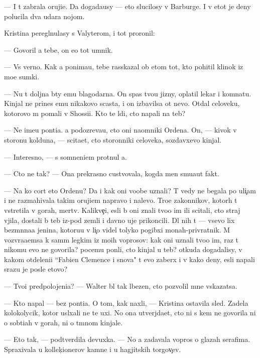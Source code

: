 \documentclass[10pt]{book}
\begin{document}
— I t{\yi} zabrala oruji{\y}e. Da{\y} dogada{\y}usy — eto slucilosy v Barburge. I v etot je deny polucila dva udara nojom.

Kristina peregl{\ia}nulasy s Valyterom, i tot proronil:

— Govoril {\y}a tebe, on {\y}e{\x}o tot umnik.

— Vs{\e} verno. Kak {\y}a ponima{\y}u, tebe rasskazal ob etom tot, kto pohitil klinok iz mo{\y}e{\y} sumki.

— Nu t{\yi} doljna b{\yi}ty {\y}emu blagodarna. On spas tvo{\y}u jizny, oplatil lekar{\ia} i komnatu. Kinjal ne prines {\y}emu nikakovo scast{\y}a, i on izbavilsa ot nevo. Otdal celoveku, kotorovo m{\yi} po{\y}mali v Shossi{\y}i. Kto te l{\iu}di, cto napali na teb{\ia}?

— Ne ime{\y}u pon{\ia}ti{\y}a. {\Y}a podozreva{\y}u, cto oni na{\y}omniki Ordena. On, — kivok v storonu kolduna, — scita{\y}et, cto storonniki celoveka, sozdavxevo kinjal.

— Interesno, — s somneni{\y}em prot{\ia}nul {\y}a.

— Cto ne tak? — Ona prekrasno custvovala, kogda men{\ia} smu{\x}a{\y}ut fakt{\yi}.

— Na ko{\y} cort eto Ordenu? Da i kak oni voob{\x}e uznali? T{\yi} vedy ne begala po uli{\c}am i ne razmahivala takim oruji{\y}em napravo i nalevo. Tro{\y}e zakonnikov, kotor{\yi}h t{\yi} vstretila v gorah, mertv{\yi}. Kalikve{\c}i, {\y}esli b{\yi} oni znali tvo{\y}o im{\ia} ili scitali, cto straj v{\yi}jila, dostali b{\yi} teb{\ia} iz-pod zemli i davno uje prikoncili. Dl{\ia} nih t{\yi} — vsevo lix bez{\yi}m{\ia}nna{\y}a jen{\x}ina, kotoru{\y}u v li{\c}o videl tolyko pogibxi{\y} monah-privratnik. M{\yi} vozvra{\x}a{\y}emsa k sam{\yi}m legkim iz mo{\y}ih voprosov: kak oni uznali tvo{\y}o im{\ia}, raz t{\yi} nikomu {\y}evo ne govorila? pocemu pon{\ia}li, cto kinjal u teb{\ia}? otkuda dogadalisy, v kakom otdeleni{\y}i ``Fabien Clemence i s{\yi}nov{\y}a" t{\yi} {\y}evo zaber{\e}x i v kako{\y} deny, {\y}esli napali srazu je posle etovo?

— Tvo{\y}i predpolojeni{\y}a? — Walter b{\yi}l tak l{\iu}bezen, cto pozvolil mne v{\yi}skazatsa.

— Kto napal — bez pon{\ia}ti{\y}a. O tom, kak naxli, — Kristina ostavila sled{\yi}. Zadela kolokolycik, kotor{\yi}{\y} usl{\yi}xali ne te uxi. No ona utverjda{\y}et, cto ni s kem ne govorila ni o sob{\yi}ti{\y}ah v gorah, ni o t{\e}mnom kinjale.

— Eto tak, — podtverdila devuxka. — No {\y}a zadavala vopros{\yi} o glazah serafima. Spraxivala u kollek{\c}ionerov kamne{\y} i u hagjitskih torgov{\c}ev.
\end{document}
